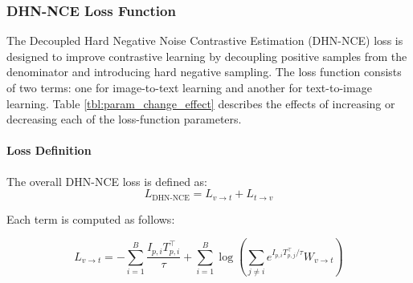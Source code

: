 \documentclass[./dissertation.tex]{subfiles}
\begin{document}
\subsubsection{DHN-NCE Loss Function}




The Decoupled Hard Negative Noise Contrastive Estimation (DHN-NCE) loss is designed to improve contrastive learning by decoupling positive samples from the denominator and introducing hard negative sampling. The loss function consists of two terms: one for image-to-text learning and another for text-to-image learning. Table \ref{tbl:param_change_effect} describes the effects of increasing or decreasing each of the loss-function parameters.


\paragraph{Loss Definition\\}

The overall DHN-NCE loss is defined as:
\begin{equation}
    L_{\text{DHN-NCE}} = L_{v \to t} + L_{t \to v}
\end{equation}

Each term is computed as follows:

\begin{equation}
    L_{v \to t} = -\sum_{i=1}^{B} \frac{I_{p,i} T_{p,i}^\top}{\tau} + \sum_{i=1}^{B} \log \left( \sum_{j \neq i} e^{I_{p,i} T_{p,j}^\top / \tau} W_{v \to t} \right)
\end{equation}
\end{document}
